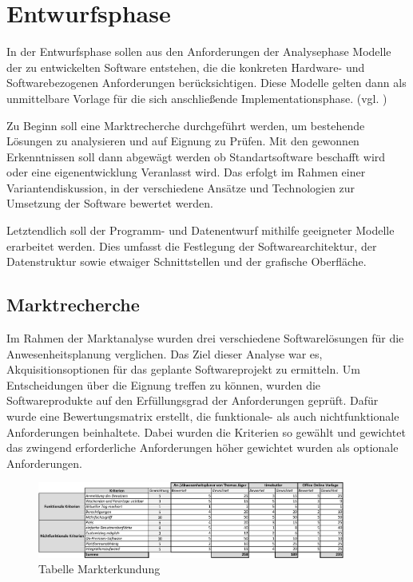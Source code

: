 \section{Entwurfsphase}
\label{sec:Entwurfsphase}
In der Entwurfsphase sollen aus den Anforderungen der Analysephase Modelle der zu entwickelten Software entstehen, die die konkreten Hardware- und Softwarebezogenen Anforderungen berücksichtigen. Diese Modelle gelten dann als unmittelbare Vorlage für die sich anschließende Implementationsphase. (vgl. \cite[S. 69]{dumke-2003})

Zu Beginn soll eine Marktrecherche durchgeführt werden, um bestehende Lösungen zu analysieren und auf Eignung zu Prüfen. Mit den gewonnen Erkenntnissen soll dann abgewägt werden ob Standartsoftware beschafft wird oder eine eigenentwicklung Veranlasst wird. Das erfolgt im Rahmen einer Variantendiskussion, in der verschiedene Ansätze und Technologien zur Umsetzung der Software bewertet werden.

Letztendlich soll der Programm- und Datenentwurf mithilfe geeigneter Modelle erarbeitet werden. Dies umfasst die Festlegung der Softwarearchitektur, der Datenstruktur sowie etwaiger Schnittstellen und der grafische Oberfläche.

\subsection{Marktrecherche}
\label{sec:Marktrecherche}
Im Rahmen der Marktanalyse wurden drei verschiedene Softwarelösungen für die Anwesenheitsplanung verglichen. Das Ziel dieser Analyse war es, Akquisitionsoptionen für das geplante Softwareprojekt zu ermitteln. Um Entscheidungen über die Eignung treffen zu können, wurden die Softwareprodukte auf den Erfüllungsgrad der Anforderungen geprüft. Dafür wurde eine Bewertungsmatrix erstellt, die funktionale- als auch nichtfunktionale Anforderungen beinhaltete. Dabei wurden die Kriterien so gewählt und gewichtet das zwingend erforderliche Anforderungen höher gewichtet wurden als optionale Anforderungen.

\begin{figure}[htb]
    \centering
    \includegraphics[width=0.9\textwidth,angle=0]{abb/Markterkundung.pdf}
    \caption[Beschreibung]{ Tabelle Markterkundung}
    \label{tab:Markterkundung}
\end{figure}
